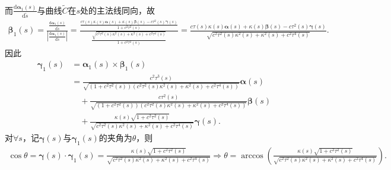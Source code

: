\documentclass[../../main.tex]{subfiles}%
\begin{document}
\begin{solution}
\begin{align*}
\end{align*}
而$\frac{\mathrm{d}\bm{\alpha}_1(s)}{\mathrm{d}\tilde{s}}$与曲线$\tilde{C}$在$s$处的主法线同向，故
\begin{align*}
\bm{\beta}_1(s) = \frac{\frac{\mathrm{d}\bm{\alpha}_1(s)}{\mathrm{d}\tilde{s}}}{\left| \frac{\mathrm{d}\bm{\alpha}_1(s)}{\mathrm{d}\tilde{s}} \right|}=\frac{\frac{c\tau(s)\kappa(s)\bm{\alpha}(s) + \kappa(s)\bm{\beta}(s) - c\tau^2(s)\bm{\gamma}(s)}{1+c^2\tau^2(s)}}{\frac{\sqrt{c^2\tau^2(s)\kappa^2(s) + \kappa^2(s) + c^2\tau^4(s)}}{1+c^2\tau^2(s)}}=\frac{c\tau(s)\kappa(s)\bm{\alpha}(s) + \kappa(s)\bm{\beta}(s) - c\tau^2(s)\bm{\gamma}(s)}{\sqrt{c^2\tau^2(s)\kappa^2(s) + \kappa^2(s) + c^2\tau^4(s)}}.
\end{align*}
因此
\begin{align*}
\bm{\gamma}_1(s) &= \bm{\alpha}_1(s) \times \bm{\beta}_1(s) \\
&=\frac{c^2\tau^3(s)}{\sqrt{\left( 1+c^2\tau^2(s) \right) \left( c^2\tau^2(s)\kappa^2(s) + \kappa^2(s) + c^2\tau^4(s) \right)}}\bm{\alpha}(s) \\
&\quad+\frac{c\tau^2(s)}{\sqrt{\left( 1+c^2\tau^2(s) \right) \left( c^2\tau^2(s)\kappa^2(s) + \kappa^2(s) + c^2\tau^4(s) \right)}}\bm{\beta}(s) \\
&\quad+\frac{\kappa(s) \sqrt{1+c^2\tau^2(s)}}{\sqrt{c^2\tau^2(s)\kappa^2(s) + \kappa^2(s) + c^2\tau^4(s)}}\bm{\gamma}(s).
\end{align*}
对$\forall s$，记$\bm{\gamma}(s)$与$\bm{\gamma}_1(s)$的夹角为$\theta$，则
\begin{align*}
\cos\theta = \bm{\gamma}(s) \cdot \bm{\gamma}_1(s) = \frac{\kappa(s)\sqrt{1+c^2\tau^2(s)}}{\sqrt{c^2\tau^2(s)\kappa^2(s) + \kappa^2(s) + c^2\tau^4(s)}} \Longrightarrow \theta = \arccos\left( \frac{\kappa(s)\sqrt{1+c^2\tau^2(s)}}{\sqrt{c^2\tau^2(s)\kappa^2(s) + \kappa^2(s) + c^2\tau^4(s)}} \right).
\end{align*}

\end{solution}
\end{document}
